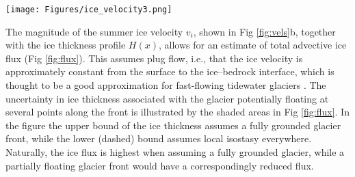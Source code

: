 \documentclass[10pt,letterpaper]{article}
\begin{document}

  \begin{figure*}[t]
 \begin{center}
  \texttt{[image: Figures/ice\_velocity3.png]}
  \caption{(a) InSAR Ice velocity data near the glacier front. Shown are mean summer (June--September) values averaged over 28 velocity fields, collected during 2012--2015. Note that there is a consistent data gap near the promontory. The shading represents the velocity magnitude, the arrows the flow direction. (b) Velocity profiles along the glacier front. Here, as in all figures, the perspective is with the direction of ice flux into the page.}
  \label{fig:vels}
  \end{center}
\end{figure*}

The magnitude of the summer ice velocity $v_i$, shown in Fig \ref{fig:vels}b, together with the ice thickness profile $H(x)$, allows for an estimate of total advective ice flux (Fig \ref{fig:flux}). This assumes plug flow, i.e., that the ice velocity is approximately constant from the surface to the ice--bedrock interface, which is thought to be a good approximation for fast-flowing tidewater glaciers \citep{Meier:te}.
The uncertainty in ice thickness associated with the glacier potentially floating at several points along the front is illustrated by the shaded areas in Fig \ref{fig:flux}. In the figure the upper bound of the ice thickness assumes a fully grounded glacier front, while the lower (dashed) bound assumes local isostasy everywhere.
Naturally, the ice flux is highest when assuming a fully grounded glacier, while a partially floating glacier front would have a correspondingly reduced flux. 

\end{document}
